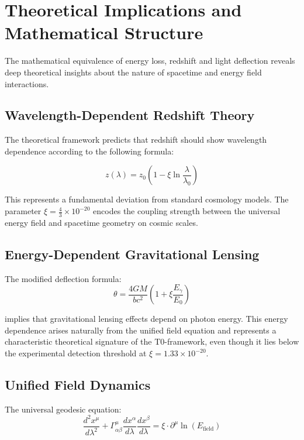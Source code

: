 \documentclass[12pt,a4paper]{article}
\newcommand{\efield}{E_{\text{field}}}
\theoremstyle{definition}
\begin{document}
	\section{Theoretical Implications and Mathematical Structure}
	
	The mathematical equivalence of energy loss, redshift and light deflection reveals deep theoretical insights about the nature of spacetime and energy field interactions.
	
	\subsection{Wavelength-Dependent Redshift Theory}
	
	The theoretical framework predicts that redshift should show wavelength dependence according to the following formula:
	
	\begin{equation}
		z(\lambda) = z_0\left(1 - \xi \ln\frac{\lambda}{\lambda_0}\right)
	\end{equation}
	
	This represents a fundamental deviation from standard cosmology models. The parameter $\xi = \frac{4}{3} \times 10^{-20}$ encodes the coupling strength between the universal energy field and spacetime geometry on cosmic scales.
	
	\subsection{Energy-Dependent Gravitational Lensing}
	
	The modified deflection formula:
	\begin{equation}
		\theta = \frac{4GM}{bc^2}\left(1 + \xi \frac{E_\gamma}{E_0}\right)
	\end{equation}
	
	implies that gravitational lensing effects depend on photon energy. This energy dependence arises naturally from the unified field equation and represents a characteristic theoretical signature of the T0-framework, even though it lies below the experimental detection threshold at $\xi = 1.33 \times 10^{-20}$.
	
	\subsection{Unified Field Dynamics}
	
	The universal geodesic equation:
	\begin{equation}
		\frac{d^2 x^\mu}{d\lambda^2} + \Gamma^\mu_{\alpha\beta}\frac{dx^\alpha}{d\lambda}\frac{dx^\beta}{d\lambda} = \xi \cdot \partial^\mu \ln(\efield)
	\end{equation}
	
\end{document}
